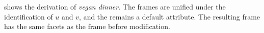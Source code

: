 \documentclass[output=paper,colorlinks,citecolor=brown,chinesefont]{langscibook}
\begin{document}
%
 shows the derivation of %
 \emph{vegan dinner}. The frames are unified under the identification of $u$ and $v$, and the  remains a default attribute. The resulting frame %
  has the same facets as the  frame before modification. %
%
%
\end{document}
